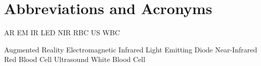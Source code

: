 \chapter{Abbreviations and Acronyms}\label{chapter:abbreviations}

\begin{multicols}{2}
\setlength{\parindent}{0pt}

	AR
	\hfill \break 
	EM
	\hfill \break 
	IR
	\hfill \break 
	LED
	\hfill \break 
	NIR
	\hfill \break 
	RBC
	\hfill \break 
	US
	\hfill \break 
	WBC



	
\columnbreak
 
	Augmented Reality
	\hfill \break 
	Electromagnetic
	\hfill \break 
	Infrared
	\hfill \break 
	Light Emitting Diode
 	\hfill \break
	Near-Infrared
	\hfill \break
	Red Blood Cell 
	\hfill \break
	Ultrasound
	\hfill \break
	White Blood Cell 

\end{multicols}